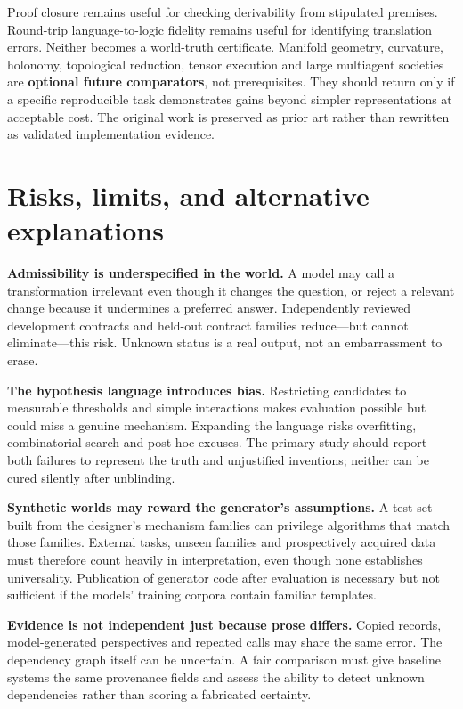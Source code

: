\documentclass[11pt,a4paper]{article}
\begin{document}
Proof closure remains useful for checking derivability from stipulated
premises. Round-trip language-to-logic fidelity remains useful for
identifying translation errors. Neither becomes a world-truth
certificate. Manifold geometry, curvature, holonomy, topological
reduction, tensor execution and large multiagent societies are
\textbf{optional future comparators}, not prerequisites. They should
return only if a specific reproducible task demonstrates gains beyond
simpler representations at acceptable cost. The original work is
preserved as prior art rather than rewritten as validated implementation
evidence.

\section{Risks, limits, and alternative
explanations}\label{risks-limits-and-alternative-explanations}

\textbf{Admissibility is underspecified in the world.} A model may call
a transformation irrelevant even though it changes the question, or
reject a relevant change because it undermines a preferred answer.
Independently reviewed development contracts and held-out contract
families reduce---but cannot eliminate---this risk. Unknown status is a
real output, not an embarrassment to erase.

\textbf{The hypothesis language introduces bias.} Restricting candidates
to measurable thresholds and simple interactions makes evaluation
possible but could miss a genuine mechanism. Expanding the language
risks overfitting, combinatorial search and post hoc excuses. The
primary study should report both failures to represent the truth and
unjustified inventions; neither can be cured silently after unblinding.

\textbf{Synthetic worlds may reward the generator's assumptions.} A test
set built from the designer's mechanism families can privilege
algorithms that match those families. External tasks, unseen families
and prospectively acquired data must therefore count heavily in
interpretation, even though none establishes universality. Publication
of generator code after evaluation is necessary but not sufficient if
the models' training corpora contain familiar templates.

\textbf{Evidence is not independent just because prose differs.} Copied
records, model-generated perspectives and repeated calls may share the
same error. The dependency graph itself can be uncertain. A fair
comparison must give baseline systems the same provenance fields and
assess the ability to detect unknown dependencies rather than scoring a
fabricated certainty.
\end{document}
